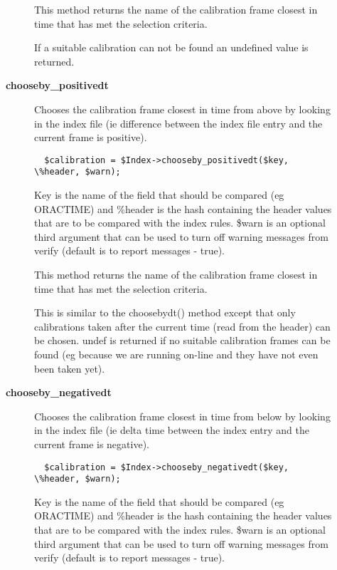 \begin{description}
\begin{description}
This method returns the name of the calibration frame closest in
time that has met the selection criteria.



If a suitable calibration can not be found an undefined value is returned.


\item[{\textbf{chooseby\_positivedt}}] \mbox{}

Chooses the calibration frame closest in time from above by looking
in the index file (ie difference between the index file entry and
the current frame is positive).

\begin{verbatim}
  $calibration = $Index->chooseby_positivedt($key, \%header, $warn);
\end{verbatim}


Key is the name of the field that should be compared (eg ORACTIME)
and \%header is the hash containing the header values that are to
be compared with the index rules. \$warn is an optional third argument
that can be used to turn off warning messages from verify (default
is to report messages - true).



This method returns the name of the calibration frame closest in
time that has met the selection criteria.



This is similar to the choosebydt() method except that only
calibrations taken after the current time (read from the
header) can be chosen. undef is returned if no suitable
calibration frames can be found (eg because we are running
on-line and they have not even been taken yet).


\item[{\textbf{chooseby\_negativedt}}] \mbox{}

Chooses the calibration frame closest in time from below by looking
in the index file (ie delta time between the index entry and the
current frame is negative).

\begin{verbatim}
  $calibration = $Index->chooseby_negativedt($key, \%header, $warn);
\end{verbatim}


Key is the name of the field that should be compared (eg ORACTIME)
and \%header is the hash containing the header values that are to
be compared with the index rules. \$warn is an optional third argument
that can be used to turn off warning messages from verify (default
is to report messages - true).




\end{description}
\end{description}
